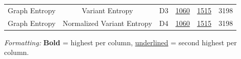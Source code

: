 \begin{table}[H]
\begin{tabular}{cccccc}
Graph Entropy & Variant Entropy & D3 & \underline{1060} & \underline{1515} & 3198 \\
Graph Entropy & Normalized Variant Entropy & D4 & \underline{1060} & \underline{1515} & 3198 \\
\bottomrule
\end{tabular}
\vspace{2pt}
\begin{minipage}{\linewidth}
\centering
\scriptsize
\tiny
\textit{Formatting:} \textbf{Bold} = highest per column, \underline{underlined} = second highest per column.
\end{minipage}
\end{table}
